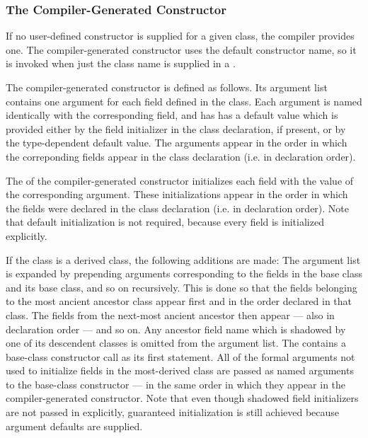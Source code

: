 \subsubsection{The Compiler-Generated Constructor}
\label{The_Compiler_Generated_Constructor}

If no user-defined constructor is supplied for a given class, the compiler
provides one.  The compiler-generated constructor uses the default constructor
name, so it is invoked when just the class name is supplied in
a .  

The compiler-generated constructor is defined as follows.  Its argument list
contains one argument for each field defined in the class.  Each argument is
named identically with the corresponding field, and has has a default value
which is provided either by the field initializer in the class declaration, if
present, or by the type-dependent default value.  The arguments appear in the
order in which the correponding fields appear in the class declaration (i.e. in
declaration order).

The  of the compiler-generated
constructor initializes each field with the value of the corresponding
argument.  These initializations appear in the order in which the fields were
declared in the class declaration (i.e. in declaration order).  Note that default
initialization is not required, because every field is initialized explicitly.

If the class is a derived class, the following additions are made: The argument
list is expanded by prepending arguments corresponding to the fields in the base
class and its base class, and so on recursively.  This is done so that the
fields belonging to the most ancient ancestor class appear first and in the
order declared in that class.  The fields from the next-most ancient ancestor
then appear --- also in declaration order --- and so on.  Any ancestor field name
which is shadowed by one of its descendent classes is omitted from the argument
list.  The  contains a base-class constructor call
as its first statement.  All of the formal arguments not used to initialize
fields in the most-derived class are passed as named arguments to the
base-class constructor --- in the same order in which they appear in the
compiler-generated constructor.
Note that even though shadowed field initializers are not passed in explicitly,
guaranteed initialization is still achieved because argument defaults are supplied.

